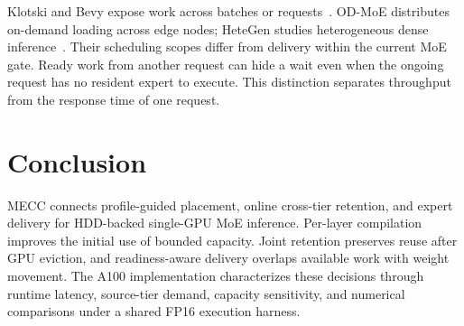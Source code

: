 \documentclass[conference,9pt,letterpaper]{IEEEtran}
\begin{document}
Klotski and Bevy expose work across batches or requests~\cite{klotski,bevy}. OD-MoE distributes on-demand loading across edge nodes; HeteGen studies heterogeneous dense inference~\cite{odmoe,hetegen}. Their scheduling scopes differ from delivery within the current MoE gate. Ready work from another request can hide a wait even when the ongoing request has no resident expert to execute. This distinction separates throughput from the response time of one request.

\section{Conclusion}
MECC connects profile-guided placement, online cross-tier retention, and expert delivery for HDD-backed single-GPU MoE inference. Per-layer compilation improves the initial use of bounded capacity. Joint retention preserves reuse after GPU eviction, and readiness-aware delivery overlaps available work with weight movement. The A100 implementation characterizes these decisions through runtime latency, source-tier demand, capacity sensitivity, and numerical comparisons under a shared FP16 execution harness.

\clearpage
\nobalance
{}


\end{document}
